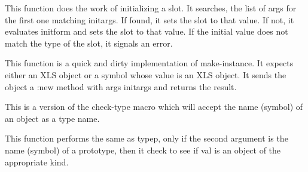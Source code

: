 \beginDefinition


\beginDocumentation
This function does the work of initializing a slot.  It searches,
the list of args for the first one matching initargs.  If found, it
sets the slot to that value.  If not, it evaluates initform and sets
the slot to that value. 
  If the initial value does not match the type of the slot, it signals
an error.\endDocumentation
{}\endUsage
\beginArguments
{}\endArg
{}\endArg
{}\endArg
{}\endArg
{}\endArg
\endArguments

\endDefinition


\beginDefinition


\beginDocumentation
This function is a quick and dirty implementation of make-instance.  It 
  expects either an XLS object or a symbol whose value is an XLS object.  
  It sends the object a :new method with args \<initargs\> and returns the 
  result.\endDocumentation
{}\endUsage
\beginArguments
{}\endArg
{}\endArg
\endArguments
\beginReturn
\singleReturn {}\endcReturn
\endReturn

\endDefinition


\beginDefinition


\beginDocumentation
This is a version of the check-type macro which will accept the
  name (symbol) of an object as a type name.\endDocumentation
{}\endUsage

\endDefinition


\beginDefinition


\beginDocumentation
This function performs the same as typep, only if the second
  argument is the name (symbol) of a prototype, then it check to see
  if val is an object of the appropriate kind.\endDocumentation
{}\endUsage
\beginArguments
{}\endArg
{}\endArg
\endArguments
\beginReturn
\singleReturn {}\endtReturn
\endReturn


